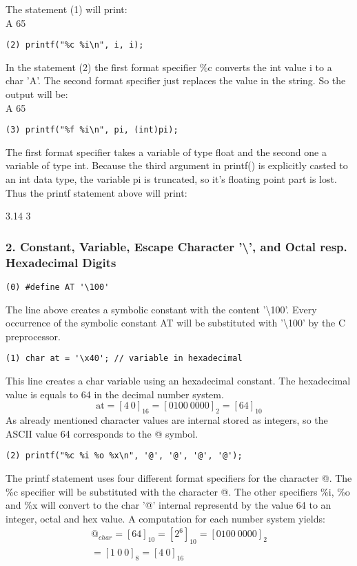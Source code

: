 \documentclass[12pt]{article}
\begin{document}
The statement (1) will print:\\
A 65

\begin{lstlisting}
(2) printf("%c %i\n", i, i);
\end{lstlisting}
In the statement (2) the first format specifier \%c converts the int value i to a char 'A'. The second format specifier just replaces the value in the string.
So the output will be:\\
A 65

\begin{lstlisting}
(3) printf("%f %i\n", pi, (int)pi);
\end{lstlisting}
The first format specifier takes a variable of type float and the second one a variable of type int.
Because the third argument in printf() is explicitly casted to an int data type, the variable pi is truncated, so it's floating point part is lost. Thus the printf statement above will print:

3.14 3

\subsubsection*{2. Constant, Variable, Escape Character '\textbackslash', and Octal resp. Hexadecimal Digits}
\begin{lstlisting}
(0) #define AT '\100'
\end{lstlisting}
The line above creates a symbolic constant with the content '\textbackslash 100'.
Every occurrence of the symbolic constant AT will be substituted with '\textbackslash 100' by the C preprocessor.

\begin{lstlisting}
(1) char at = '\x40'; // variable in hexadecimal
\end{lstlisting}
This line creates a char variable using an hexadecimal constant. The hexadecimal value is equals to 64 in the decimal number system.
\begin{equation}
\text{at} = [4 \: 0]_{16} = [0100 \: 0000]_2 =  [64]_{10}
\end{equation} 
As already mentioned character values are internal stored as integers, so the ASCII value 64 corresponds to the @ symbol.

\begin{lstlisting}
(2) printf("%c %i %o %x\n", '@', '@', '@', '@');
\end{lstlisting}
The printf statement uses four different format specifiers for the character @.
The \%c specifier will be substituted with the character @. The other specifiers \%i, \%o and \%x will convert to the char '@' internal representd by the value 64 to an integer, octal and hex value. 
A computation for each number system yields:
\begin{equation}
\begin{split}
@_{char} = {[64]}_{10} = {[2^6]}_{10} = {[0100 \: 0000]}_2 \\
= [1 \: 0 \: 0]_{8} =[4 \: 0]_{16}
\end{split}
\end{equation}
\end{document}
